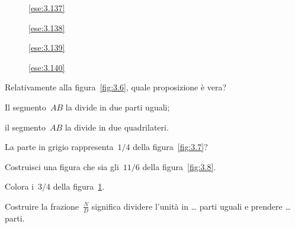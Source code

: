 \begin{inaccessibleblock}
 \begin{figure}[t]
 \begin{minipage}[b]{.20\textwidth}
 \centering
 \caption{\ref{ese:3.137}}\label{fig:3.6}
 \end{minipage}\hfil
 \begin{minipage}[b]{.20\textwidth}
 \centering 
 \caption{\ref{ese:3.138}}\label{fig:3.7}
 \end{minipage}\hfil
 \begin{minipage}[b]{.20\textwidth}
 \centering
 \caption{\ref{ese:3.139}}\label{fig:3.8}
 \end{minipage}\hfil
 \begin{minipage}[b]{.23\textwidth}
 \centering
 \caption{\ref{ese:3.140}}\label{fig:3.9}
 \end{minipage}\hfil
\end{figure}
\end{inaccessibleblock}

\begin{esercizio}
\label{ese:3.137}
Relativamente alla figura~\ref{fig:3.6}, quale proposizione è vera?

\begin{enumeratea}
\item Il segmento~\(AB\) la divide in due parti uguali;
\item il segmento~\(AB\) la divide in due quadrilateri.
\end{enumeratea}
\end{esercizio}

 \begin{esercizio}
 \label{ese:3.138}
La parte in grigio rappresenta~\(1/4\) della figura~\ref{fig:3.7}?
\end{esercizio}

\begin{esercizio}
\label{ese:3.139}
 Costruisci una figura che sia gli~\(11/6\) della figura~\ref{fig:3.8}.
\end{esercizio}

\begin{esercizio}
\label{ese:3.140}
Colora i~\(3/4\) della figura~\ref{fig:3.9}.
\end{esercizio}

\begin{esercizio}
\label{ese:3.141}
Costruire la frazione~\(\frac{N}{D}\) significa dividere l'unità in \ldots 
parti uguali e prendere \ldots parti.
\end{esercizio}

